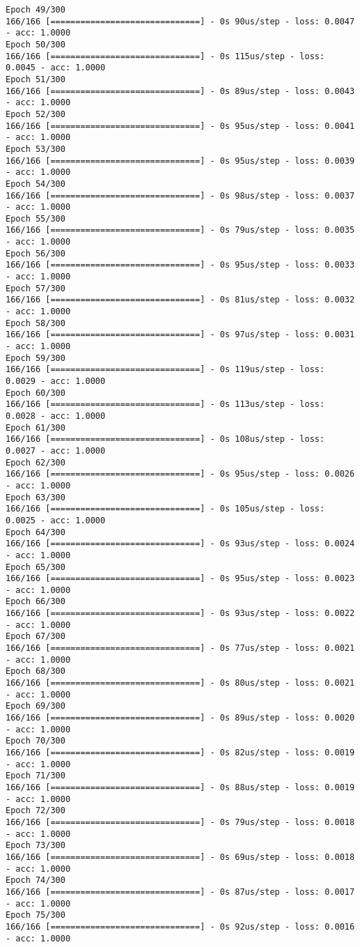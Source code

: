 \documentclass[11pt]{article}
\begin{document}
\begin{Verbatim}[commandchars=\\\{\}]
Epoch 49/300
166/166 [==============================] - 0s 90us/step - loss: 0.0047 - acc: 1.0000
Epoch 50/300
166/166 [==============================] - 0s 115us/step - loss: 0.0045 - acc: 1.0000
Epoch 51/300
166/166 [==============================] - 0s 89us/step - loss: 0.0043 - acc: 1.0000
Epoch 52/300
166/166 [==============================] - 0s 95us/step - loss: 0.0041 - acc: 1.0000
Epoch 53/300
166/166 [==============================] - 0s 95us/step - loss: 0.0039 - acc: 1.0000
Epoch 54/300
166/166 [==============================] - 0s 98us/step - loss: 0.0037 - acc: 1.0000
Epoch 55/300
166/166 [==============================] - 0s 79us/step - loss: 0.0035 - acc: 1.0000
Epoch 56/300
166/166 [==============================] - 0s 95us/step - loss: 0.0033 - acc: 1.0000
Epoch 57/300
166/166 [==============================] - 0s 81us/step - loss: 0.0032 - acc: 1.0000
Epoch 58/300
166/166 [==============================] - 0s 97us/step - loss: 0.0031 - acc: 1.0000
Epoch 59/300
166/166 [==============================] - 0s 119us/step - loss: 0.0029 - acc: 1.0000
Epoch 60/300
166/166 [==============================] - 0s 113us/step - loss: 0.0028 - acc: 1.0000
Epoch 61/300
166/166 [==============================] - 0s 108us/step - loss: 0.0027 - acc: 1.0000
Epoch 62/300
166/166 [==============================] - 0s 95us/step - loss: 0.0026 - acc: 1.0000
Epoch 63/300
166/166 [==============================] - 0s 105us/step - loss: 0.0025 - acc: 1.0000
Epoch 64/300
166/166 [==============================] - 0s 93us/step - loss: 0.0024 - acc: 1.0000
Epoch 65/300
166/166 [==============================] - 0s 95us/step - loss: 0.0023 - acc: 1.0000
Epoch 66/300
166/166 [==============================] - 0s 93us/step - loss: 0.0022 - acc: 1.0000
Epoch 67/300
166/166 [==============================] - 0s 77us/step - loss: 0.0021 - acc: 1.0000
Epoch 68/300
166/166 [==============================] - 0s 80us/step - loss: 0.0021 - acc: 1.0000
Epoch 69/300
166/166 [==============================] - 0s 89us/step - loss: 0.0020 - acc: 1.0000
Epoch 70/300
166/166 [==============================] - 0s 82us/step - loss: 0.0019 - acc: 1.0000
Epoch 71/300
166/166 [==============================] - 0s 88us/step - loss: 0.0019 - acc: 1.0000
Epoch 72/300
166/166 [==============================] - 0s 79us/step - loss: 0.0018 - acc: 1.0000
Epoch 73/300
166/166 [==============================] - 0s 69us/step - loss: 0.0018 - acc: 1.0000
Epoch 74/300
166/166 [==============================] - 0s 87us/step - loss: 0.0017 - acc: 1.0000
Epoch 75/300
166/166 [==============================] - 0s 92us/step - loss: 0.0016 - acc: 1.0000

\end{Verbatim}
\end{document}
